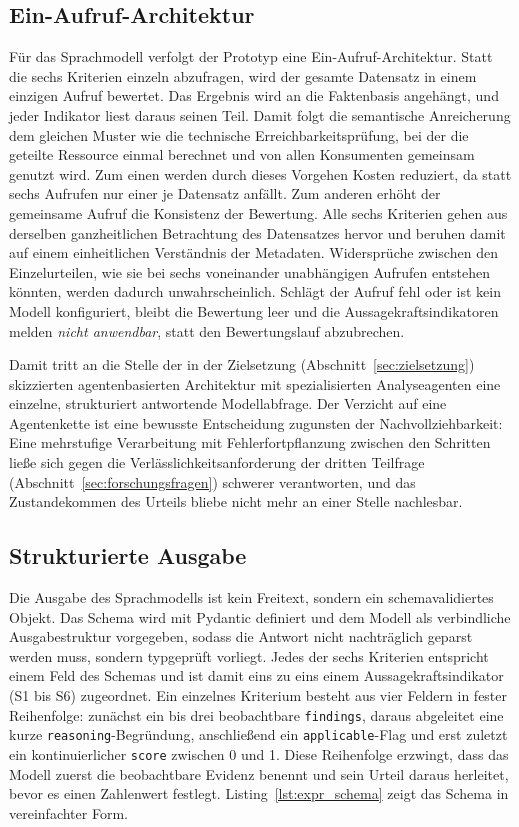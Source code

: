 \subsection{Ein-Aufruf-Architektur}

Für das Sprachmodell verfolgt der Prototyp eine Ein-Aufruf-Architektur. 
Statt die sechs Kriterien einzeln abzufragen, wird der gesamte Datensatz in einem einzigen Aufruf bewertet.
Das Ergebnis wird an die Faktenbasis angehängt, und jeder Indikator liest daraus seinen Teil. 
Damit folgt die semantische Anreicherung dem gleichen Muster wie die technische Erreichbarkeitsprüfung, bei der die geteilte Ressource einmal berechnet und von allen Konsumenten gemeinsam genutzt wird. Zum einen werden durch dieses Vorgehen Kosten reduziert, da statt sechs Aufrufen nur einer je Datensatz anfällt. Zum anderen erhöht der gemeinsame Aufruf die Konsistenz der Bewertung. Alle sechs Kriterien gehen aus derselben ganzheitlichen Betrachtung des Datensatzes hervor und beruhen damit auf einem einheitlichen Verständnis der Metadaten. Widersprüche zwischen den Einzelurteilen, wie sie bei sechs voneinander unabhängigen Aufrufen entstehen könnten, werden dadurch unwahrscheinlich. Schlägt der Aufruf fehl oder ist kein Modell konfiguriert, bleibt die Bewertung leer und die Aussagekraftsindikatoren melden \textit{nicht anwendbar}, statt den Bewertungslauf abzubrechen.

Damit tritt an die Stelle der in der Zielsetzung (Abschnitt~\ref{sec:zielsetzung}) skizzierten agentenbasierten Architektur mit spezialisierten Analyseagenten eine einzelne, strukturiert antwortende Modellabfrage. Der Verzicht auf eine Agentenkette ist eine bewusste Entscheidung zugunsten der Nachvollziehbarkeit: Eine mehrstufige Verarbeitung mit Fehlerfortpflanzung zwischen den Schritten ließe sich gegen die Verlässlichkeitsanforderung der dritten Teilfrage (Abschnitt~\ref{sec:forschungsfragen}) schwerer verantworten, und das Zustandekommen des Urteils bliebe nicht mehr an einer Stelle nachlesbar.

\subsection{Strukturierte Ausgabe}

Die Ausgabe des Sprachmodells ist kein Freitext, sondern ein schemavalidiertes Objekt. Das Schema wird mit Pydantic definiert und dem Modell als verbindliche Ausgabestruktur vorgegeben, sodass die Antwort nicht nachträglich geparst werden muss, sondern typgeprüft vorliegt. Jedes der sechs Kriterien entspricht einem Feld des Schemas und ist damit eins zu eins einem Aussagekraftsindikator (S1 bis S6) zugeordnet. Ein einzelnes Kriterium besteht aus vier Feldern in fester Reihenfolge: zunächst ein bis drei beobachtbare \texttt{findings}, daraus abgeleitet eine kurze \texttt{reasoning}-Begründung, anschließend ein \texttt{applicable}-Flag und erst zuletzt ein kontinuierlicher \texttt{score} zwischen 0 und 1. Diese Reihenfolge erzwingt, dass das Modell zuerst die beobachtbare Evidenz benennt und sein Urteil daraus herleitet, bevor es einen Zahlenwert festlegt. Listing~\ref{lst:expr_schema} zeigt das Schema in vereinfachter Form.

